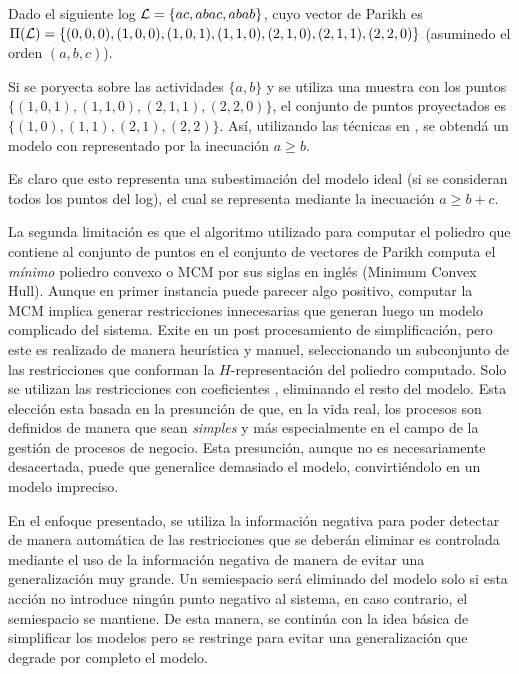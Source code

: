 \begin{example}
Dado el siguiente log ${\mathcal L}=\{ ac, abac, abab \}$, cuyo vector de Parikh es 
$\Pi({\mathcal L})=\{ (0,0,0),(1,0,0), (1,0,1),\\(1,1,0), (2,1,0), (2,1,1),(2,2,0) \}$ (asuminedo el orden $(a,b,c)$).

Si se poryecta sobre las actividades $\{a,b\}$ y se utiliza una muestra con los puntos
$\{(1,0,1),(1,1,0),(2,1,1),(2,2,0)\}$, el conjunto de puntos proyectados es
$\{ (1,0), (1,1), (2,1), (2,2) \}$. 
Así, utilizando las técnicas en \cite{CarmonaC14}, se obtendá un modelo con
representado por la inecuación \mbox{$a \ge b$}.

Es claro que esto representa una subestimación del modelo ideal (si se consideran
todos los puntos del log), el cual se representa mediante la inecuación $a \ge b + c$.
\end{example}

La segunda limitación es que el algoritmo utilizado para computar el poliedro que contiene al 
conjunto de puntos en el conjunto de vectores de Parikh computa el \emph{mínimo} poliedro convexo 
o MCM por sus siglas en inglés (Minimum Convex Hull). Aunque en primer instancia puede parecer algo
positivo, computar la MCM implica generar restricciones innecesarias que generan luego un modelo
complicado del sistema. Exite en \cite{CarmonaC14} un post procesamiento de simplificación, pero este es
realizado de manera heurística y manuel, seleccionando un subconjunto de las restricciones que conforman la
$H$-representación del poliedro computado. Solo se utilizan las restricciones con coeficientes , 
eliminando el resto del modelo. 
Esta elección esta basada en la presunción de que, en la vida real, los procesos son definidos de manera
que sean \textit{simples} y más especialmente en el campo de la gestión de procesos de negocio. Esta presunción,
aunque no es necesariamente desacertada, puede que generalice demasiado el modelo, convirtiéndolo en un modelo
impreciso.

En el enfoque presentado, se utiliza la información negativa para poder detectar de manera automática
de las restricciones que se deberán eliminar es controlada mediante el uso de la información
negativa de manera de evitar una generalización muy grande. Un semiespacio será eliminado del modelo solo si esta acción
no introduce ningún punto negativo al sistema, en caso contrario, el semiespacio se mantiene. De esta manera, se
continúa con la idea básica de simplificar los modelos pero se restringe para evitar una generalización que degrade por
completo el modelo.


